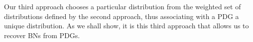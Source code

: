 \documentclass{article}
\newcommand{\commentout}[1]{\ignorespaces}
\newcommand{\MN}{PDG}
\newcommand{\MNs}{\MN s}
\numberwithin{equation}{section}
\begin{document}
	Our third approach chooses a particular distribution from the weighted set of distributions defined by the second 	approach, thus associating with a PDG a unique distribution. As we shall show, it is this third approach that allows us to recover BNs from PDGs. 

\end{document}
